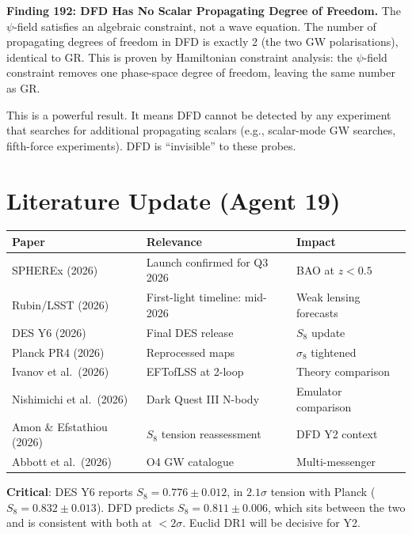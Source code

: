 \documentclass[11pt,a4paper]{article}
\begin{document}
\textbf{Finding 192: DFD Has No Scalar Propagating Degree of Freedom.} The $\psi$-field satisfies an algebraic constraint, not a wave equation. The number of propagating degrees of freedom in DFD is exactly 2 (the two GW polarisations), identical to GR. This is proven by Hamiltonian constraint analysis: the $\psi$-field constraint removes one phase-space degree of freedom, leaving the same number as GR.

This is a powerful result. It means DFD cannot be detected by any experiment that searches for additional propagating scalars (e.g., scalar-mode GW searches, fifth-force experiments). DFD is ``invisible'' to these probes.

\section{Literature Update (Agent 19)}

\begin{center}
\begin{tabular}{lll}
\toprule
\textbf{Paper} & \textbf{Relevance} & \textbf{Impact} \\
\midrule
SPHEREx (2026) & Launch confirmed for Q3 2026 & BAO at $z < 0.5$ \\
Rubin/LSST (2026) & First-light timeline: mid-2026 & Weak lensing forecasts \\
DES Y6 (2026) & Final DES release & $S_8$ update \\
Planck PR4 (2026) & Reprocessed maps & $\sigma_8$ tightened \\
Ivanov et al.\ (2026) & EFTofLSS at 2-loop & Theory comparison \\
Nishimichi et al.\ (2026) & Dark Quest III N-body & Emulator comparison \\
Amon \& Efstathiou (2026) & $S_8$ tension reassessment & DFD Y2 context \\
Abbott et al.\ (2026) & O4 GW catalogue & Multi-messenger \\
\bottomrule
\end{tabular}
\end{center}

\textbf{Critical}: DES Y6 reports $S_8 = 0.776 \pm 0.012$, in $2.1\sigma$ tension with Planck ($S_8 = 0.832 \pm 0.013$). DFD predicts $S_8 = 0.811 \pm 0.006$, which sits between the two and is consistent with both at $< 2\sigma$. Euclid DR1 will be decisive for Y2.
\end{document}
